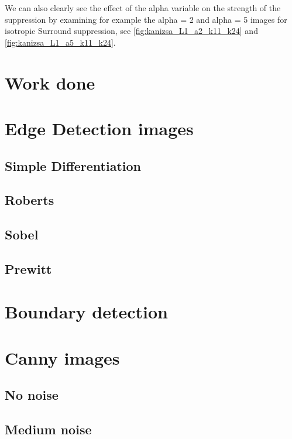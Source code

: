 \documentclass[10pt,a4paper]{article}
\begin{document}
We can also clearly see the effect of the alpha variable on the strength of the suppression by examining for example the alpha = 2 and alpha = 5 images for isotropic Surround suppression, see \ref{fig:kanizsa_L1_a2_k11_k24} and \ref{fig:kanizsa_L1_a5_k11_k24}.



\section{Work done}

\section{Edge Detection images}
\subsection{Simple Differentiation}



\subsection{Roberts}


\subsection{Sobel}


\subsection{Prewitt}



\section{Boundary detection}


\section{Canny images}
\subsection{No noise}

\subsection{Medium noise}

\end{document}
